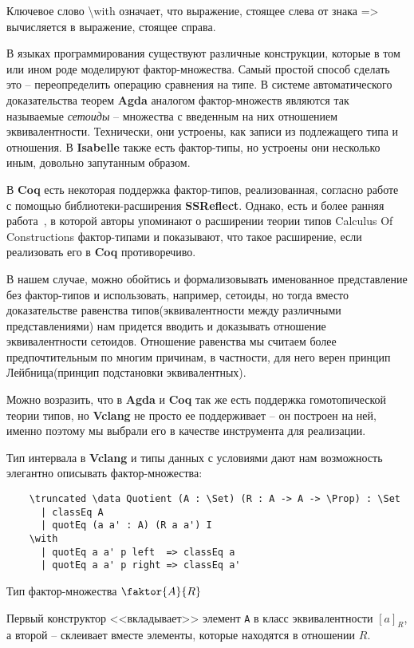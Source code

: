 Ключевое слово \textbackslash{}with означает, что выражение, стоящее слева от знака => вычисляется в выражение, стоящее справа.

В языках программирования существуют различные конструкции, которые в том или ином роде моделируют фактор-множества. Самый простой способ сделать это -- переопределить операцию сравнения на типе. В системе автоматического доказательства теорем \textbf{Agda} аналогом фактор-множеств являются так называемые \textit{сетоиды} -- множества с введенным на них отношением эквивалентности. Технически, они устроены, как записи из подлежащего типа и отношения. В \textbf{Isabelle} также есть фактор-типы, но устроены они несколько иным, довольно запутанным образом.

В \textbf{Coq} есть некоторая поддержка фактор-типов, реализованная, согласно работе~\cite{cohen2013pragmatic} с помощью библиотеки-расширения \textbf{SSReflect}. Однако, есть и более ранняя работа~\cite{chicli2002mathematical}, в которой авторы упоминают о расширении теории типов Calculus Of Constructions фактор-типами и показывают, что такое расширение, если реализовать его в \textbf{Coq} противоречиво.

В нашем случае, можно обойтись и формализовывать именованное представление без фактор-типов и использовать, например, сетоиды, но тогда вместо доказательстве равенства типов(эквивалентности между различными представлениями) нам придется вводить и доказывать отношение эквивалентности сетоидов. Отношение равенства мы считаем более предпочтительным по многим причинам, в частности, для него верен принцип Лейбница(принцип подстановки эквивалентных).

Можно возразить, что в  \textbf{Agda} и \textbf{Coq} так же есть поддержка гомотопической теории типов, но \textbf{Vclang} не просто ее поддерживает -- он построен на ней, именно поэтому мы выбрали его в качестве инструмента для реализации.

Тип интервала в \textbf{Vclang} и типы данных с условиями дают нам возможность элегантно описывать фактор-множества:

\begin{listing}[H]
  \begin{verbatim}
    \truncated \data Quotient (A : \Set) (R : A -> A -> \Prop) : \Set
      | classEq A
      | quotEq (a a' : A) (R a a') I
    \with
      | quotEq a a' p left  => classEq a
      | quotEq a a' p right => classEq a'
  \end{verbatim}
  \caption{Тип фактор-множества $\faktor{A}{R}$}
\end{listing}

Первый конструктор <<вкладывает>> элемент \texttt{A} в класс эквивалентности $[a]_{R}$, а второй -- склеивает вместе элементы, которые находятся в отношении $R$.
